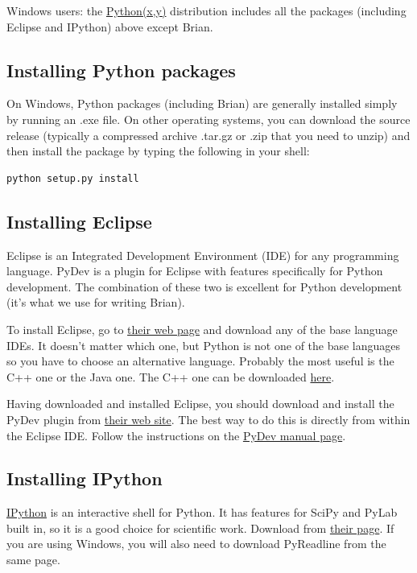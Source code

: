 \documentclass[letterpaper,10pt,english]{manual}
\begin{document}
Windows users: the \href{http://www.pythonxy.com/}{Python(x,y)} distribution includes all the packages
(including Eclipse and IPython) above except Brian.


\subsection{Installing Python packages}

On Windows, Python packages (including Brian) are generally installed simply by running an .exe file.
On other operating systems, you can download the source release (typically a compressed
archive .tar.gz or .zip that you need to unzip) and then install the package by typing the following in your
shell:

\begin{Verbatim}[commandchars=@\[\]]
python setup.py install
\end{Verbatim}


\subsection{Installing Eclipse}

Eclipse is an Integrated Development Environment (IDE) for any programming language. PyDev is a plugin
for Eclipse with features specifically for Python development. The combination of these two is
excellent for Python development (it's what we use for writing Brian).

To install Eclipse, go to \href{http://www.eclipse.org/}{their web page} and download any of the base
language IDEs. It doesn't matter which one, but Python is not one of the base languages so you have
to choose an alternative language. Probably the most useful is the C++ one or the Java one. The C++
one can be downloaded \href{http://www.eclipse.org/cdt/downloads.php}{here}.

Having downloaded and installed Eclipse, you should download and install the PyDev plugin from
\href{http://pydev.sourceforge.net/}{their web site}. The best way to do this is directly from within
the Eclipse IDE. Follow the instructions on the \href{http://www.fabioz.com/pydev/manual\_101\_root.html}{PyDev manual page}.


\subsection{Installing IPython}

\href{http://ipython.scipy.org/moin/}{IPython} is an interactive shell for Python.
It has features for SciPy and PyLab built in, so it is a good choice for scientific work.
Download from \href{http://ipython.scipy.org/moin/Download}{their page}. If you are using Windows, you
will also need to download PyReadline from the same page.
\end{document}
